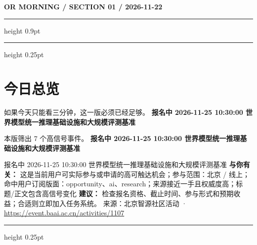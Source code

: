 \documentclass[10.5pt]{ctexart}
\begin{document}
{\small\bfseries OR MORNING / SECTION 01 / 2026-11-22}
\vspace{2mm}
\hrule height 0.9pt
\vspace{1.5mm}
\hrule height 0.25pt
\vspace{4mm}
\section*{今日总览}
{\color{ormuted} 如果今天只能看三分钟，这一版必须已经足够。}
\vspace{2mm}
{\fontsize{25}{29}\selectfont\bfseries 报名中 2026-11-25 10:30:00 世界模型统一推理基础设施和大规模评测基准}\par
\vspace{2mm}
{\large 本版筛出 7 个高信号事件。}
\vspace{3mm}
{\Large\bfseries 报名中 2026-11-25 10:30:00 世界模型统一推理基础设施和大规模评测基准}\par
报名中 2026-11-25 10:30:00 世界模型统一推理基础设施和大规模评测基准
\textbf{与你有关：} 这是当前用户可实际参与或申请的高可触达机会；参与范围：北京 / 线上；命中用户订阅版面：opportunity、ai、research；来源接近一手且权威度高；标题/正文包含高信号变化
\textbf{建议：} 检查报名资格、截止时间、参与形式和预期收益；合适则立即加入任务系统。
{\footnotesize\color{ormuted} 来源：北京智源社区活动 · \url{https://event.baai.ac.cn/activities/1107}}
\vspace{3mm}
\hrule height 0.25pt
\vspace{3mm}
\end{document}
